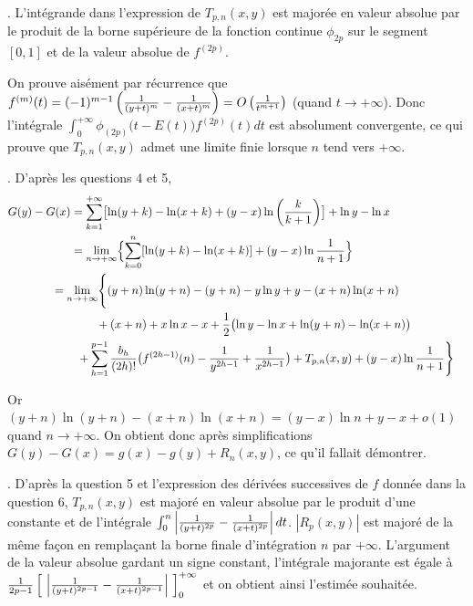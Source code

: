 {\begin{enumerate}
{. L'intégrande dans l'expression de $T_{p,n}(x,y)$ est majorée en valeur
absolue par le produit de la borne supérieure de la fonction continue
$\phi_{2p}$ sur le segment $[0,1]$ et de la valeur absolue de $f^{(2p)}$.

On prouve aisément par récurrence que
$f^{(m)}(t)=(-1)^{m-1}\left({1\over(y+t)^m}-{1\over(x+t)^m}\right)
= O \left( {1\over t^{m+1}} \right)$ (quand $t \to +\infty$).
Donc l'intégrale $\int_0^{+\infty} \phi_{(2p)} \big( t-E(t) \big) f^{(2p)}(t)dt$
est absolument convergente, ce qui prouve que $T_{p,n}(x,y)$ admet une limite
finie lorsque $n$ tend vers $+\infty$.



. D'après les questions 4 et 5,
$$\begin{aligned}
G(y)-G(x)&=\sum_{k=1}^{+\infty}\bigl[ \ln(y+k) - \ln(x+k)
                        + (y-x)\ln\left({k\over k+1}\right) \bigr] + \ln y - \ln x \cr
        &=\lim_{n\to +\infty}\Bigl\{\sum_{k=0}^n [\ln(y+k) - \ln(x+k)]
                 + (y-x)\ln{1\over n+1} \Bigr\}                          \cr 
        &\mkern-30mu =\lim_{n\to +\infty} \Biggl\{
                 (y+n)\ln(y+n) - (y+n) - y\ln y + y - (x+n)\ln(x+n)             \cr
        &\mkern40mu  + (x+n) + x\ln x - x
         + {1\over2} \bigl( \ln y - \ln x + \ln(y+n) - \ln(x+n) \bigr)          \cr
        &\mkern10mu +\sum_{h=1}^{p-1} {b_h\over(2h)!}
                \big( f^{(2h-1)}(n) - {1\over y^{2h-1}} + {1\over x^{2h-1}}\big) 
         + T_{p,n}(x,y) + (y-x)\ln{1\over n+1} \Biggr\}                  \cr
\end{aligned}
$$

Or $(y+n)\ln(y+n) - (x+n)\ln(x+n) = (y-x)\ln n + y - x + o(1)$
quand $n\to +\infty$. On obtient donc après simplifications
$G(y)-G(x)=g(x)-g(y)+R_n(x,y)$, ce qu'il fallait démontrer.

. D'après la question 5 et l'expression des dérivées successives de $f$ donnée dans
la question 6, $T_{p,n}(x,y)$ est majoré en valeur absolue par le produit d'une constante
et de l'intégrale
$\int_0^n \left| {1\over (y+t)^{2p}} - {1\over (x+t)^{2p}} \right| dt$.
$|R_p(x,y)|$ est majoré de la m{\^e}me façon en remplaçant la borne finale d'intégration
$n$ par $+\infty$. L'argument de la valeur absolue gardant un signe constant, l'intégrale
majorante est égale à
${1\over 2p-1} \left[ \ \left| {1\over (y+t)^{2p-1}}
                                - {1\over (x+t)^{2p-1}} \right| \ \right]_0^{+\infty}$
et on obtient ainsi l'estimée souhaitée.


}
\end{enumerate}}
